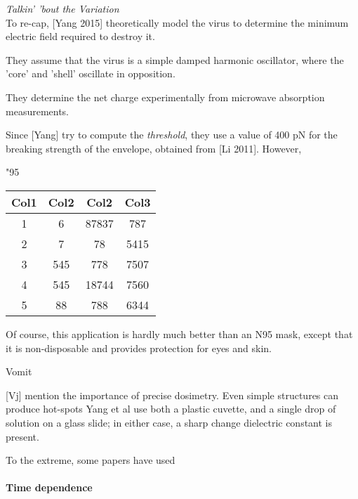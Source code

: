 \documentclass[fleqn,10pt]{article}
\begin{document}
\cite{POLAROGRAPHICOXYGENSENSORS}

\clearpage
{\Large \it Talkin' 'bout the Variation}\\

To re-cap, [Yang 2015] theoretically model the virus to determine the minimum electric field required to destroy it. 

They assume that the virus is a simple damped harmonic oscillator, where the 'core' and 'shell' oscillate in opposition. 

They determine the net charge experimentally from microwave absorption measurements.

Since [Yang] try to compute the {\it threshold}, they use a value of 400 pN for the breaking strength of the envelope, obtained from [Li 2011]. However,  

"95%

\begin{center}
 \begin{tabular}{||c c c c||} 
 \hline
 Col1 & Col2 & Col2 & Col3 \\ [0.5ex] 
 \hline\hline
 1 & 6 & 87837 & 787 \\ 
 \hline
 2 & 7 & 78 & 5415 \\
 \hline
 3 & 545 & 778 & 7507 \\
 \hline
 4 & 545 & 18744 & 7560 \\
 \hline
 5 & 88 & 788 & 6344 \\ [1ex] 
 \hline
\end{tabular}
\end{center}





Of course, this application is hardly much better than an N95 mask, except that it is non-disposable and provides protection for eyes and skin.

Vomit


[Vj] mention the importance of precise dosimetry. Even simple structures can produce hot-spots 
Yang et al use both a plastic cuvette, and a single drop of solution on a glass slide; in either case, a sharp change dielectric constant is present.

To the extreme, some papers have used














\clearpage
\paragraph{\textbf{Time dependence}}\
\end{document}
